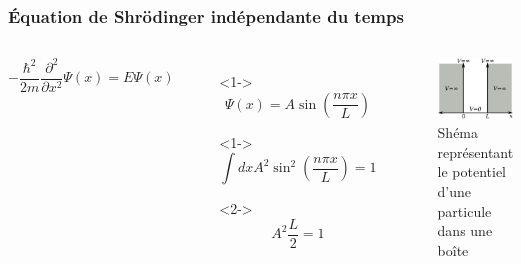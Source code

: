 \documentclass[aspectratio=169]{beamer}
\begin{document}
\begin{frame}
\frametitle{Équation de Shrödinger indépendante du temps}

\begin{columns}

\begin{equation}\tag{4}
-\frac{\hbar^2}{2m}\frac{\partial^2}{\partial x^2}\Psi(x)=E\Psi(x)
\end{equation} 

\begin{itemize}
\item[]<1-> \begin{equation}\tag{5}
\Psi(x)=A\sin(\frac{n\pi x}{L})
\end{equation}  
\item[]<1-> \begin{equation}\tag{6}
\int dx A^2\sin^2(\frac{n\pi x}{L})=1
\end{equation}
\item[]  <2-> \begin{equation}\tag{7}
A^2 \frac{L}{2}=1
\end{equation}
\end{itemize}
\begin{figure}
\includegraphics[scale=0.4]{Pot}
\caption{Shéma représentant le potentiel d'une particule dans une boîte}
\end{figure}
\end{columns}

\end{frame}
\end{document}
